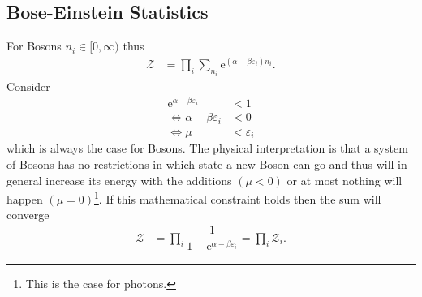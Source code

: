 \documentclass[a4paper,10pt]{article}
\numberwithin{equation}{section}
\begin{document}
\begin{multicols}{2}
\subsection{Bose-Einstein Statistics}
For Bosons $n_i  \in [0,\infty)$ thus
\begin{align} 
  \mathcal{Z} &= \prod_{i}^{}\sum_{n_i}^{}\text{e}^{(\alpha -\beta \varepsilon _i)n_i}
.\end{align} 
Consider
\begin{align} 
  \text{e}^{\alpha -\beta \varepsilon _i}&<1\\
  \Leftrightarrow \alpha -\beta \varepsilon _i&<0\\
  \Leftrightarrow \mu &<\varepsilon _i
\end{align} 
which is always the case for Bosons.
The physical interpretation is that a system of Bosons has no restrictions in which state a new Boson can go and thus will in general increase its energy with the additions $(\mu <0)$ or at most nothing will happen $(\mu =0)$\footnote{This is the case for photons.}.
If this mathematical constraint holds then the sum will converge
\begin{align} 
  \mathcal{Z} &= \prod_{i}^{}\dfrac{1}{1-\text{e}^{\alpha -\beta \varepsilon _i}}=\prod_{i}^{}\mathcal{Z}_i
.\end{align} 


\end{multicols}
\end{document}
